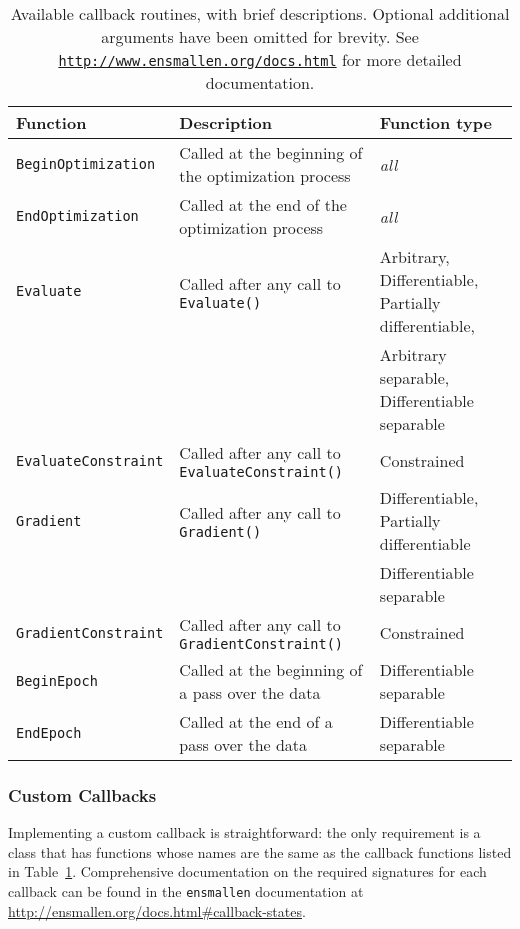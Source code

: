 \begin{table}[!b]
\centering
\small
\begin{tabular}{lll}
\toprule
{\bf Function} & {\bf Description} & {\bf Function type} \\
\hline
\texttt{BeginOptimization}   & Called at the beginning of the optimization process  & {\it all} \\
\texttt{EndOptimization}     & Called at the end of the optimization process & {\it all} \\
\texttt{Evaluate}            & Called after any call to {\tt Evaluate()}            & Arbitrary, Differentiable, Partially differentiable,  \\
                             &                                                      & Arbitrary separable, Differentiable separable \\
\texttt{EvaluateConstraint}  & Called after any call to {\tt EvaluateConstraint()}  & Constrained \\
\texttt{Gradient}            & Called after any call to {\tt Gradient()}            & Differentiable, Partially differentiable \\
                             &                                                      & Differentiable separable \\
\texttt{GradientConstraint}  & Called after any call to {\tt GradientConstraint()}  & Constrained \\
\texttt{BeginEpoch}          & Called at the beginning of a pass over the data      & Differentiable separable \\
\texttt{EndEpoch}            & Called at the end of a pass over the data            & Differentiable separable \\

\bottomrule
\end{tabular}
\vspace{0.5ex}
\caption
  {
  Available callback routines, with brief descriptions.
  Optional additional arguments have been omitted for brevity.
  See {\href{http://www.ensmallen.org/docs.html}{\mbox{\tt http://www.ensmallen.org/docs.html}}} for more detailed documentation.
  }
\label{tab:callback_list}
\end{table}


\subsubsection{Custom Callbacks}

Implementing a custom callback is straightforward:
the only requirement is a class that has functions whose names are the same as the callback
functions listed in Table~\ref{tab:callback_list}.
Comprehensive documentation on the required signatures for each callback can be
found in the {\tt ensmallen} documentation at
\url{http://ensmallen.org/docs.html#callback-states}.


